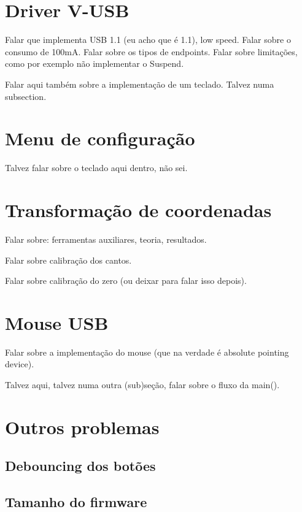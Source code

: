 \documentclass[brazil,pagestart=firstchapter]{abnt}
\begin{document}
\section{Driver V-USB\label{sec:vusb}}

Falar que implementa USB 1.1 (eu acho que é 1.1), low speed.
Falar sobre o consumo de 100mA.
Falar sobre os tipos de endpoints.
Falar sobre limitações, como por exemplo não
implementar o Suspend.

Falar aqui também sobre a implementação de um teclado. Talvez numa
subsection.

\section{Menu de configuração\label{sec:menu}}

Talvez falar sobre o teclado aqui dentro, não sei.

\section{Transformação de coordenadas\label{sec:coordenadas}}

Falar sobre: ferramentas auxiliares, teoria, resultados.

Falar sobre calibração dos cantos.

Falar sobre calibração do zero (ou deixar para falar isso depois).

\section{Mouse USB\label{sec:mouse}}

Falar sobre a implementação do mouse (que na verdade é absolute pointing
device).

Talvez aqui, talvez numa outra (sub)seção, falar sobre o fluxo da main().

\section{Outros problemas\label{sec:outros_problemas}}

\subsection{Debouncing dos botões\label{sec:debouncing}}

\subsection{Tamanho do firmware\label{sec:firmware_size}}
\end{document}
